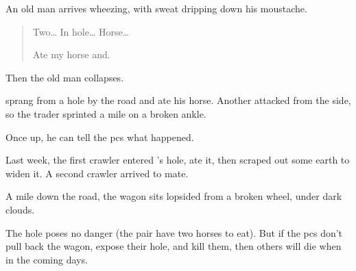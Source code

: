 \begin{boxtext}
  An old man arrives wheezing, with sweat dripping down his moustache.

  \begin{quotation}
    Two\ldots
    In hole\ldots
    Horse\ldots

    Ate my horse and.
  \end{quotation}
  Then the old man collapses.
\end{boxtext}

\setcounter{wounds}{6}
\humantrader

 sprang from a hole by the road and ate his horse.
Another attacked from the side, so the trader sprinted a mile on a broken ankle.

Once up, he can tell the \glspl{pc} what happened.

\begin{exampletext}
  Last week, the first \gls{crawler} entered 's hole, ate it, then scraped out some earth to widen it.
  A second \gls{crawler} arrived to mate.
\end{exampletext}

\begin{boxtext}
  A mile down the road, the wagon sits lopsided from a broken wheel, under dark clouds.
\end{boxtext}

The hole poses no danger (the pair have two horses to eat).
But if the \glspl{pc} don't pull back the wagon, expose their hole, and kill them, then others will die when in the coming days.

\setcounter{r3}{1}
\chitincrawler

\chitincrawler

